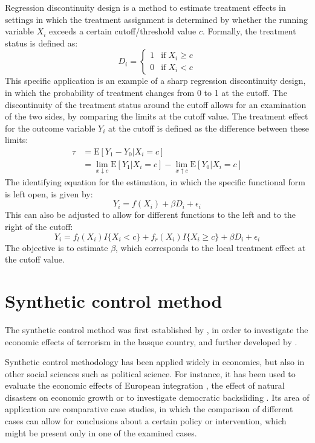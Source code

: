 \documentclass{scrbook}
\begin{document}
Regression discontinuity design is a method to estimate treatment
effects in settings in which the treatment assignment is determined by
whether the running variable \(X_{i}\) exceeds a certain
cutoff/threshold value \(c\). Formally, the treatment status is defined
as: \begin{equation}
D_{i} = \begin{cases}
1 & \text{if}\; X_{i} \geq c \\
0 & \text{if}\; X_{i} < c
\end{cases}
\end{equation} This specific application is an example of a sharp
regression discontinuity design, in which the probability of treatment
changes from 0 to 1 at the cutoff. The discontinuity of the treatment
status around the cutoff allows for an examination of the two sides, by
comparing the limits at the cutoff value. The treatment effect for the
outcome variable \(Y_{i}\) at the cutoff is defined as the difference
between these limits: \begin{align}    
\tau & =\text{E}[Y_{1}-Y_{0}\vert X_{i}=c] \\
     & =\lim_{x\downarrow c} \text{E}[Y_{1}\vert X_{i}=c]-\lim_{x\uparrow c} \text{E}[Y_{0}\vert X_{i}=c] \nonumber
\end{align} \noindent The identifying equation for the estimation, in
which the specific functional form is left open, is given by:
\begin{equation}
Y_{i}=f(X_{i})+\beta D_{i}+\epsilon_{i}
\end{equation} This can also be adjusted to allow for different
functions to the left and to the right of the cutoff: \begin{equation}
Y_{i}=f_{l}(X_{i})I\{X_{i}<c\}+f_{r}(X_{i})I\{X_{i}\geq c\}+\beta D_{i}+\epsilon_{i}
\end{equation} The objective is to estimate \(\beta\), which corresponds
to the local treatment effect at the cutoff value.

\section{Synthetic control method}

The synthetic control method was first established by
\textcite{abadie_economic_2003}, in order to investigate the economic
effects of terrorism in the basque country, and further developed by
\textcite{abadie_synthetic_2010}.

Synthetic control methodology has been applied widely in economics, but
also in other social sciences such as political science. For instance,
it has been used to evaluate the economic effects of European
integration \parencite{campos_institutional_2019}, the effect of natural
disasters on economic growth \parencite{cavallo_catastrophic_2013} or to
investigate democratic backsliding
\parencite{meyerrose_unintended_2020}. Its area of application are
comparative case studies, in which the comparison of different cases can
allow for conclusions about a certain policy or intervention, which
might be present only in one of the examined cases.
\end{document}
